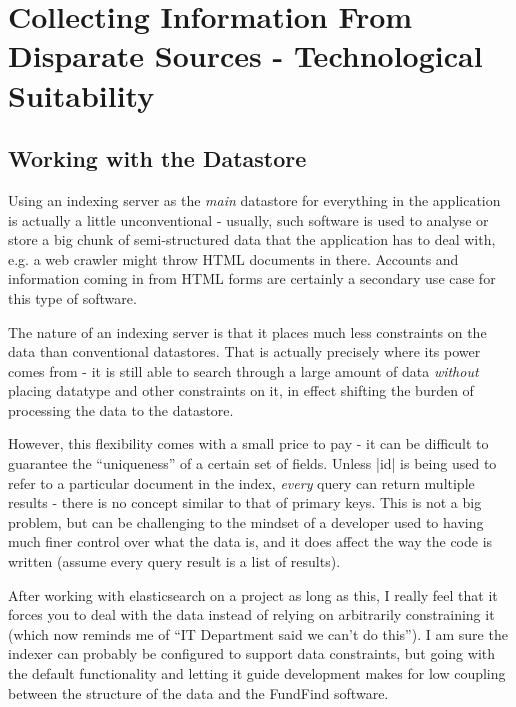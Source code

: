 \section{Collecting Information From Disparate Sources - Technological Suitability}

\subsection{Working with the Datastore}
\label{eval-datastore}
Using an indexing server as the \emph{main} datastore for everything in the application is actually a little unconventional - usually, such software is used to analyse or store a big chunk of semi-structured data that the application has to deal with, e.g. a web crawler might throw HTML documents in there. Accounts and information coming in from HTML forms are certainly a secondary use case for this type of software.

The nature of an indexing server is that it places much less constraints on the data than conventional datastores. That is actually precisely where its power comes from - it is still able to search through a large amount of data \emph{without} placing datatype and other constraints on it, in effect shifting the burden of processing the data to the datastore.

However, this flexibility comes with a small price to pay - it can be difficult to guarantee the ``uniqueness'' of a certain set of fields. Unless |id| is being used to refer to a particular document in the index, \emph{every} query can return multiple results - there is no concept similar to that of primary keys. This is not a big problem, but can be challenging to the mindset of a developer used to having much finer control over what the data is, and it does affect the way the code is written (assume every query result is a list of results).

After working with elasticsearch on a project as long as this, I really feel that it forces you to deal with the data instead of relying on arbitrarily constraining it (which now reminds me of ``IT Department said we can't do this''). I am sure the indexer can probably be configured to support data constraints, but going with the default functionality and letting it guide development makes for low coupling between the structure of the data and the FundFind software.

